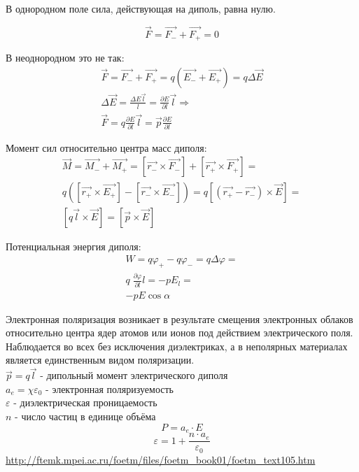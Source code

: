 \documentclass[a4paper,12pt]{article}
\begin{document}
В однородном поле сила, действующая на диполь, равна нулю.

\begin{equation}
	\vec{F} = \vec{F_-} + \vec{F_+} = 0
\end{equation}

В неоднородном это не так:
\begin{equation}
\begin{gathered}
	\vec{F} = \vec{F_-} + \vec{F_+} = q (\vec{E_-} + \vec{E_+}) = q \Delta \vec{E} \\
	\Delta \vec{E} = \frac {\Delta E \vec{l}}{l} = \frac {\partial E} {\partial l} \vec{l} \Rightarrow \\
	\vec{F} = q \frac {\partial E} {\partial l} \vec{l} = \vec{p} \frac {\partial E} {\partial l}
\end{gathered}
\end{equation}

Момент сил относительно центра масс диполя:
\begin{equation}
\begin{gathered}
	\vec{M} = \vec{M_-} + \vec{M_+} = [\vec{r_-} \times \vec{F_-}] + [\vec{r_+} \times \vec{F_+}] = \\
	q ([\vec{r_+} \times \vec{E_+}] - [\vec{r_-} \times \vec{E_-}]) = q [(\vec{r_+} - \vec{r_-}) \times \vec{E}] = \\
	[q \vec{l} \times \vec{E}] = [\vec{p} \times \vec{E}]
\end{gathered}
\end{equation}

Потенциальная энергия диполя: 
\begin{equation}
\begin{gathered}
	W = q \varphi_+ - q \varphi_- = q \Delta \varphi = \\
	q \; \frac{\partial \varphi}{\partial l} l = -p E_l = \\
	-p E \cos {\alpha}
\end{gathered}
\end{equation}


Электронная поляризация возникает в результате смещения электронных облаков относительно центра ядер атомов или ионов под действием электрического поля. Наблюдается во всех без исключения диэлектриках, а в неполярных материалах является единственным видом поляризации.\\
$\vec{p} = q\vec{l}$ - дипольный момент электрического диполя\\
$a_e = \chi \varepsilon_0$ - электронная поляризуемость\\
$\varepsilon$ - диэлектрическая проницаемость\\
$n$ - число частиц в единице объёма\\
\begin{equation}
	P = a_e \cdot E
\end{equation}
\begin{equation}
	\varepsilon = 1 + \frac{n \cdot a_e}{\varepsilon _0}
\end{equation}
\url{http://ftemk.mpei.ac.ru/foetm/files/foetm_book01/foetm_text105.htm}
\end{document}

